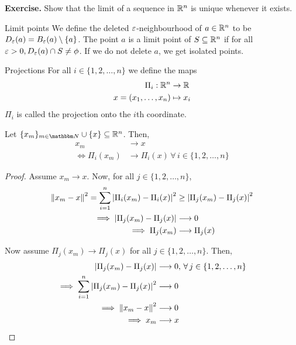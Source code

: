 \documentclass[../Analysis-3.tex]{subfiles}
\begin{document}
\textbf{Exercise.} Show that the limit of a sequence in $ \mathbb{R}^n $ is unique whenever it exists.

\begin{Def}{Limit points}{}
  We define the deleted $ \varepsilon $-neighbourhood of $ a \in \mathbb{R}^n $ to be $ D_\varepsilon(a) = B_\varepsilon(a) \setminus \{a\} $. The point $ a $ is a limit point of $ S \subseteq \mathbb{R}^n $ if for all $ \varepsilon > 0, D_\varepsilon(a) \cap S \neq \phi $. If we do not delete $ a $, we get isolated points.
\end{Def}

\begin{Def}{Projections}{}
  For all $ i \in \{1,2, \dots, n\} $ we define the maps
  \begin{align*}
    \Pi_i : \mathbb{R}^n          & \to \mathbb{R}      \\
    x = (x_1, \dots, x_n) & \mapsto x_i
  \end{align*}
  $ \Pi_i $ is called the projection onto the $ i $th coordinate.
\end{Def}

\begin{Thm}{}{}
  Let $ \{x_m\}_{m \in \N} \cup \{x\} \subseteq \R^n $. Then,
  \begin{align*}
    x_m             & \longrightarrow x                                              \\
    \iff \Pi_i(x_m) & \longrightarrow \Pi_i(x) \, \forall \, i \in \{1,2, \dots, n\}
  \end{align*}
\end{Thm}
\begin{proof}
  Assume $ x_m \longrightarrow x $. Now, for all $ j \in \{1,2, \dots, n\} $,
  \begin{align*}
    \norm{x_m-x}^2 = \sum_{i=1}^{n} \abs{\Pi_i(x_m) - \Pi_i(x)}^2 & \geq \abs{\Pi_j(x_m) - \Pi_j(x)}^2 \\
    \implies \abs{\Pi_j(x_m) - \Pi_j(x)}                          & \longrightarrow 0                  \\
    \implies \Pi_j(x_m)                                           & \longrightarrow \Pi_j(x)
  \end{align*}

  Now assume $ \Pi_j(x_m) \longrightarrow \Pi_j(x) $ for all $ j \in \{1,2, \dots, n\}
  $. Then,
  \begin{align*}
    \abs{\Pi_j(x_m) - \Pi_j(x)}                           & \longrightarrow 0, \, \forall \, j \in \{1,2, \dots, n\} \\
    \implies \sum_{i=1}^{n} \abs{\Pi_j(x_m) - \Pi_j(x)}^2 & \longrightarrow 0                                        \\
    \implies \norm{x_m - x}^2                             & \longrightarrow 0                                        \\
    \implies x_m                                          & \longrightarrow x
  \end{align*}
\end{proof}
\end{document}
